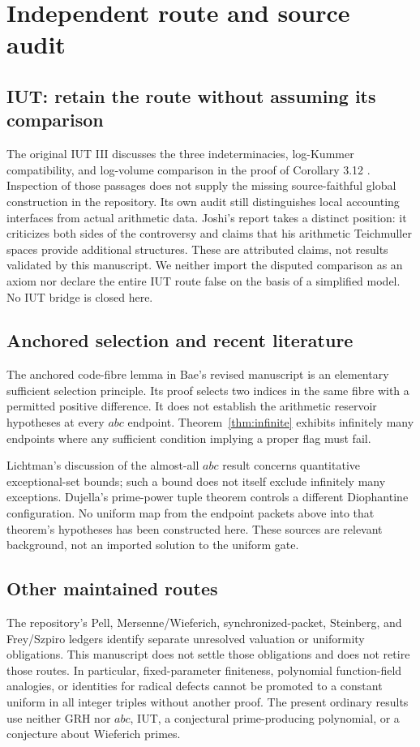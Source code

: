 \documentclass[11pt]{article}
\theoremstyle{definition}\newtheorem{definition}[theorem]{Definition}
\theoremstyle{remark}\newtheorem{remark}[theorem]{Remark}
\begin{document}
\section{Independent route and source audit}
\subsection{IUT: retain the route without assuming its comparison}
The original IUT III discusses the three indeterminacies, log-Kummer
compatibility, and log-volume comparison in the proof of Corollary 3.12
\cite{iut}. Inspection of those passages does not supply the missing
source-faithful global construction in the repository. Its own audit still
distinguishes local accounting interfaces from actual arithmetic data.
Joshi's report \cite{joshi} takes a distinct position: it criticizes both
sides of the controversy and claims that his arithmetic Teichmuller spaces
provide additional structures. These are attributed claims, not results
validated by this manuscript. We neither import the disputed comparison as
an axiom nor declare the entire IUT route false on the basis of a simplified
model. No IUT bridge is closed here.

\subsection{Anchored selection and recent literature}
The anchored code-fibre lemma in Bae's revised manuscript
\cite{bae} is an elementary sufficient selection principle. Its proof
selects two indices in the same fibre with a permitted positive difference.
It does not establish the arithmetic reservoir hypotheses at every \(abc\)
endpoint. Theorem~\ref{thm:infinite} exhibits infinitely many endpoints
where any sufficient condition implying a proper flag must fail.

Lichtman's discussion of the almost-all \(abc\) result \cite{lichtman}
concerns quantitative exceptional-set bounds; such a bound does not itself
exclude infinitely many exceptions. Dujella's prime-power tuple theorem
\cite{dujella} controls a different Diophantine configuration. No uniform
map from the endpoint packets above into that theorem's hypotheses has been
constructed here. These sources are relevant background, not an imported
solution to the uniform gate.

\subsection{Other maintained routes}
The repository's Pell, Mersenne/Wieferich, synchronized-packet, Steinberg,
and Frey/Szpiro ledgers identify separate unresolved valuation or uniformity
obligations. This manuscript does not settle those obligations and does not
retire those routes. In particular, fixed-parameter finiteness, polynomial
function-field analogies, or identities for radical defects cannot be promoted
to a constant uniform in all integer triples without another proof. The
present ordinary results use neither GRH nor \(abc\), IUT, a conjectural
prime-producing polynomial, or a conjecture about Wieferich primes.
\end{document}
